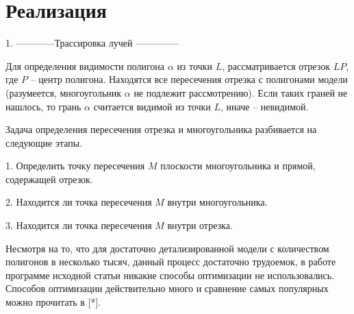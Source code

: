 \section*{Реализация}

1. ------------Трассировка лучей --------------

Для определения видимости полигона $ \alpha $ из точки $ L $, рассматривается отрезок $ LP $, где $ P $ -- центр полигона. Находятся все пересечения отрезка с полигонами модели (разумеется, многоугольник $ \alpha $ не подлежит рассмотрению). Если таких граней не нашлось, то грань $ \alpha $ считается видимой из точки $ L $, иначе -- невидимой. 

Задача определения пересечения отрезка и многоугольника разбивается на следующие этапы.

1. Определить точку пересечения $ M $ плоскости многоугольника и прямой, содержащей отрезок.

2. Находится ли точка пересечения $ M $ внутри многоугольника.

3. Находится ли точка пересечения $ M $ внутри отрезка.

Несмотря на то, что для достаточно детализированной модели с количеством полигонов в несколько тысяч, данный процесс достаточно трудоемок, в работе программе исходной статьи никакие способы оптимизации не использовались. Способов оптимизации действительно много и сравнение самых популярных можно прочитать в [*].

